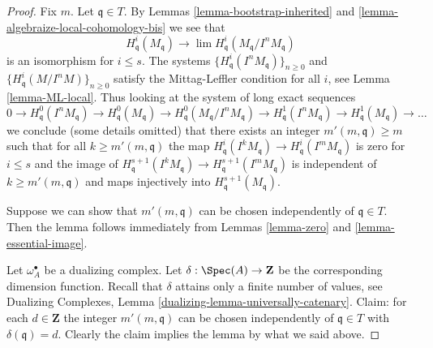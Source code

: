 \begin{proof}
Fix $m$. Let $\mathfrak q \in T$.
By Lemmas \ref{lemma-bootstrap-inherited} and
\ref{lemma-algebraize-local-cohomology-bis}
we see that
$$
H^i_\mathfrak q(M_\mathfrak q)
\longrightarrow
\lim H^i_\mathfrak q(M_\mathfrak q/I^nM_\mathfrak q)
$$
is an isomorphism for $i \leq s$. The systems
$\{H^i_\mathfrak q(I^nM_\mathfrak q)\}_{n \geq 0}$ and
$\{H^i_\mathfrak q(M/I^nM)\}_{n \geq 0}$
satisfy the Mittag-Leffler condition for all $i$, see
Lemma \ref{lemma-ML-local}. Thus looking at the system of
long exact sequences
$$
0 \to H^0_\mathfrak q(I^nM_\mathfrak q) \to
H^0_\mathfrak q(M_\mathfrak q) \to
H^0_\mathfrak q(M_\mathfrak q/I^nM_\mathfrak q) \to
H^1_\mathfrak q(I^nM_\mathfrak q) \to
H^1_\mathfrak q(M_\mathfrak q) \to \ldots
$$
we conclude (some details omitted) that there exists an integer
$m'(m, \mathfrak q) \geq m$ such that for all $k \geq m'(m, \mathfrak q)$
the map
$H^i_\mathfrak q(I^kM_\mathfrak q) \to H^i_\mathfrak q(I^mM_\mathfrak q)$
is zero for $i \leq s$ and the image of
$H^{s + 1}_\mathfrak q(I^kM_\mathfrak q) \to
H^{s + 1}_\mathfrak q(I^mM_\mathfrak q)$
is independent of $k \geq m'(m, \mathfrak q)$ and
maps injectively into $H^{s + 1}_\mathfrak q(M_\mathfrak q)$.

\medskip\noindent
Suppose we can show that $m'(m, \mathfrak q)$ can be chosen
independently of $\mathfrak q \in T$.
Then the lemma follows immediately from Lemmas \ref{lemma-zero} and
\ref{lemma-essential-image}.

\medskip\noindent
Let $\omega_A^\bullet$ be a dualizing complex. Let
$\delta : \Spec(A) \to \mathbf{Z}$ be the corresponding
dimension function. Recall that $\delta$ attains only a
finite number of values, see
Dualizing Complexes, Lemma \ref{dualizing-lemma-universally-catenary}.
Claim: for each $d \in \mathbf{Z}$ the integer
$m'(m, \mathfrak q)$ can be chosen independently
of $\mathfrak q \in T$ with $\delta(\mathfrak q) = d$.
Clearly the claim implies the lemma by what we said above.


\end{proof}
